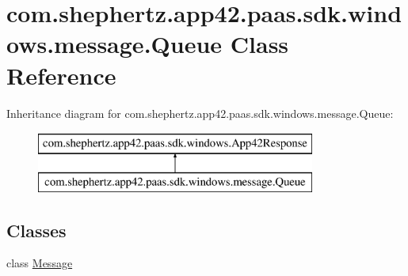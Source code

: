 \hypertarget{classcom_1_1shephertz_1_1app42_1_1paas_1_1sdk_1_1windows_1_1message_1_1_queue}{\section{com.\+shephertz.\+app42.\+paas.\+sdk.\+windows.\+message.\+Queue Class Reference}
\label{classcom_1_1shephertz_1_1app42_1_1paas_1_1sdk_1_1windows_1_1message_1_1_queue}
}
Inheritance diagram for com.\+shephertz.\+app42.\+paas.\+sdk.\+windows.\+message.\+Queue\+:\begin{figure}[H]
\begin{center}
\leavevmode
\includegraphics[height=2.000000cm]{classcom_1_1shephertz_1_1app42_1_1paas_1_1sdk_1_1windows_1_1message_1_1_queue}
\end{center}
\end{figure}
\subsection*{Classes}
\begin{DoxyCompactItemize}
\item 
class \hyperlink{classcom_1_1shephertz_1_1app42_1_1paas_1_1sdk_1_1windows_1_1message_1_1_queue_1_1_message}{Message}
\end{DoxyCompactItemize}
